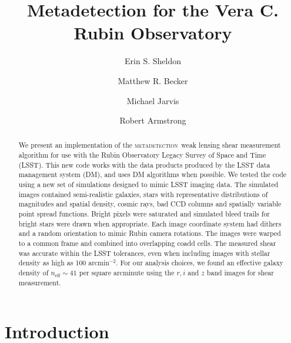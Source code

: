 \documentclass[twocolumn,twocolappendix,astrosym]{openjournal}
\newcommand{\mdet}{\textsc{metadetection}}
\newcommand{\Mcal}{\textsc{Metacalibration}}
\newcommand{\Mdet}{\textsc{Metadetection}}
\begin{document}



\title{Metadetection for the Vera C. Rubin Observatory}

\author{Erin S. Sheldon}
\author{Matthew R. Becker}
\author{Michael Jarvis}
\author{Robert Armstrong}


\begin{abstract}

		We present an implementation of the \mdet\ weak lensing shear
measurement algorithm for use with the Rubin Observatory Legacy Survey of Space
and Time (LSST).  This new code works with the data products produced by the
LSST data management system (DM), and uses DM algorithms when possible.  We
tested the code using a new set of simulations designed to mimic LSST imaging
data.  The simulated images contained semi-realistic galaxies, stars with
representative distributions of magnitudes and spatial density, cosmic rays,
bad CCD columns and spatially variable point spread functions.  Bright pixels
were saturated and simulated bleed trails for bright stars were drawn when
appropriate.  Each image coordinate system had dithers and a random orientation
to mimic Rubin camera rotations.  The images were warped to a common frame and
combined into overlapping coadd cells.  The measured shear was accurate within
the LSST tolerances, even when including images with stellar density as high as
100 arcmin$^{-2}$.  For our analysis choices, we found an effective galaxy
density of $n_{\mathrm{eff}} \sim 41$ per square arcminute using the $r, i$ and
$z$ band images for shear measurement.

\end{abstract}

\section{Introduction} \label{sec:intro}
\end{document}
